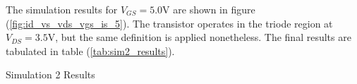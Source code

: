 \FloatBarrier

The simulation results for $V_{GS} = 5.0$\si{\volt} are shown in figure (\ref{fig:id_vs_vds_vgs_is_5}).
The transistor operates in the triode region at $V_{DS} = 3.5$\si{\volt}, but the same definition is applied nonetheless.
The final results are tabulated in table (\ref{tab:sim2_results}).

\FloatBarrier

\begin{table}[h!]
	\centering
	\caption{Simulation 2 Results}
	\label{tab:sim2_results}
\end{table}

\FloatBarrier

